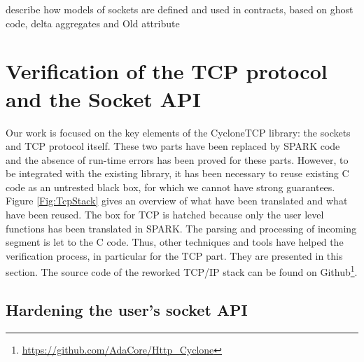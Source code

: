 \documentclass[runningheads]{llncs}
\begin{document}
describe how models of sockets are defined and used in contracts, based on
ghost code, delta aggregates and Old attribute


\section{Verification of the TCP protocol and the Socket API}
\label{sec:verif}

    Our work is focused on the key elements of the CycloneTCP library: the sockets and TCP protocol itself.
    These two parts have been replaced by SPARK code and the absence of run-time errors has been proved for
    these parts.
    However, to be integrated with the existing library, it has been necessary to reuse existing C code
    as an untrested black box, for which we cannot have strong guarantees. Figure \ref{Fig:TcpStack} gives an overview of
    what have been translated and what have been reused. The box for TCP is hatched because only the user level functions
    has been translated in SPARK. The parsing and processing of incoming segment is let to the C code.
    Thus, other techniques and tools have helped the verification process, in particular for the TCP part. They are presented in this section.
    The source code of the reworked TCP/IP stack can be found on Github\footnote{\url{https://github.com/AdaCore/Http_Cyclone}}.

\subsection{Hardening the user's socket API}
\end{document}
